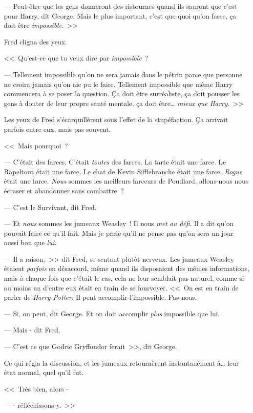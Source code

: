 --- Peut-être que les gens donneront des ristournes quand ils sauront que c'est pour Harry, dit George. Mais le plus important, c'est que quoi qu'on fasse, ça doit être \emph{impossible}.~>>

Fred cligna des yeux.

<<~Qu'est-ce que tu veux dire par \emph{impossible}~?

--- Tellement impossible qu'on ne sera jamais dans le pétrin parce que personne ne croira jamais qu'on aie pu le faire. Tellement impossible que même Harry commencera à se poser la question. Ça doit être surréaliste, ça doit pousser les gens à douter de leur propre santé mentale, ça doit être… \emph{mieux que Harry}.~>>

Les yeux de Fred s'écarquillèrent sous l'effet de la stupéfaction. Ça arrivait parfois entre eux, mais pas souvent.

<<~Mais pourquoi~?

--- C'était des farces. C'était \emph{toutes} des farces. La tarte était une farce. Le Rapeltout était une farce. Le chat de Kevin Sifflebranche était une farce. \emph{Rogue} était une farce. \emph{Nous} sommes les meilleurs farceurs de Poudlard, allons-nous nous écraser et abandonner sans combattre~?

--- C'est le Survivant, dit Fred.

--- Et \emph{nous} sommes les jumeaux Weasley~! Il nous \emph{met au défi}. Il a dit qu'on pouvait faire ce qu'il fait. Mais je parie qu'il ne pense pas qu'on sera un jour aussi bon que \emph{lui}.

--- Il a raison,~>> dit Fred, se sentant plutôt nerveux. Les jumeaux Weasley étaient \emph{parfois} en désaccord, même quand ils disposaient des mêmes informations, mais à chaque fois que c'était le cas, cela ne leur semblait pas naturel, comme si au moins un d'entre eux était en train de se fourvoyer. <<~On est en train de parler de \emph{Harry Potter}. Il peut accomplir l'impossible. Pas nous.

--- Si, on peut, dit George. Et on doit accomplir \emph{plus} impossible que lui.

--- Mais - dit Fred.

--- C'est ce que Godric Gryffondor ferait~>>, dit George.

Ce qui régla la discussion, et les jumeaux retournèrent instantanément à… leur état normal, quel qu'il fut.

<<~Très bien, alors -

--- - réfléchissons-y.~>>
